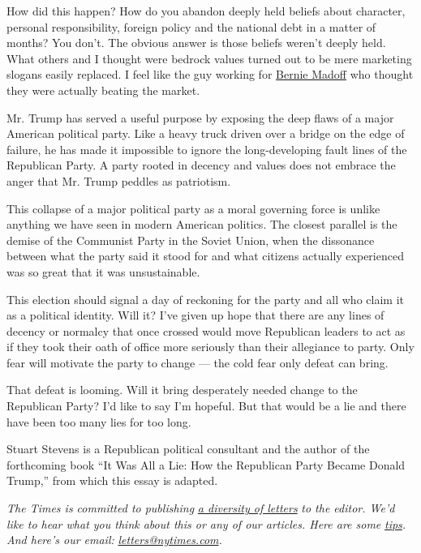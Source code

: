 How did this happen? How do you abandon deeply held beliefs about
character, personal responsibility, foreign policy and the national debt
in a matter of months? You don't. The obvious answer is those beliefs
weren't deeply held. What others and I thought were bedrock values
turned out to be mere marketing slogans easily replaced. I feel like the
guy working for
\href{https://www.nytimes.com/topic/person/bernard-l-madoff}{Bernie
Madoff} who thought they were actually beating the market.

Mr. Trump has served a useful purpose by exposing the deep flaws of a
major American political party. Like a heavy truck driven over a bridge
on the edge of failure, he has made it impossible to ignore the
long-developing fault lines of the Republican Party. A party rooted in
decency and values does not embrace the anger that Mr. Trump peddles as
patriotism.

This collapse of a major political party as a moral governing force is
unlike anything we have seen in modern American politics. The closest
parallel is the demise of the Communist Party in the Soviet Union, when
the dissonance between what the party said it stood for and what
citizens actually experienced was so great that it was unsustainable.

This election should signal a day of reckoning for the party and all who
claim it as a political identity. Will it? I've given up hope that there
are any lines of decency or normalcy that once crossed would move
Republican leaders to act as if they took their oath of office more
seriously than their allegiance to party. Only fear will motivate the
party to change --- the cold fear only defeat can bring.

That defeat is looming. Will it bring desperately needed change to the
Republican Party? I'd like to say I'm hopeful. But that would be a lie
and there have been too many lies for too long.

Stuart Stevens is a Republican political consultant and the author of
the forthcoming book ``It Was All a Lie: How the Republican Party Became
Donald Trump,'' from which this essay is adapted.

\emph{The Times is committed to publishing}
\href{https://www.nytimes.com/2019/01/31/opinion/letters/letters-to-editor-new-york-times-women.html}{\emph{a
diversity of letters}} \emph{to the editor. We'd like to hear what you
think about this or any of our articles. Here are some}
\href{https://help.nytimes.com/hc/en-us/articles/115014925288-How-to-submit-a-letter-to-the-editor}{\emph{tips}}\emph{.
And here's our email:}
\href{mailto:letters@nytimes.com}{\emph{letters@nytimes.com}}\emph{.}

